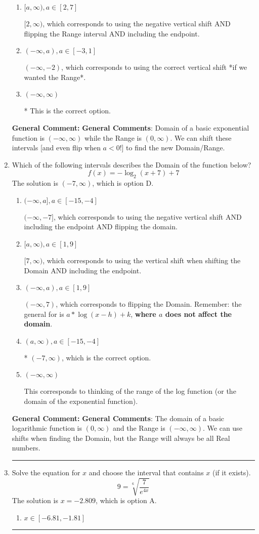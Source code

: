 \documentclass{extbook}[14pt]
\newcommand{\litem}[1]{\item #1

\rule{\textwidth}{0.4pt}}
\begin{document}
\begin{enumerate}
{\begin{enumerate}[label=\Alph*.]
$(2, \infty)$, which corresponds to using the negative vertical shift AND flipping the Range interval.
\item \( [a, \infty), a \in [2, 7] \)

$[2, \infty)$, which corresponds to using the negative vertical shift AND flipping the Range interval AND including the endpoint.
\item \( (-\infty, a), a \in [-3, 1] \)

$(-\infty, -2)$, which corresponds to using the correct vertical shift *if we wanted the Range*.
\item \( (-\infty, \infty) \)

* This is the correct option.
\end{enumerate}

\textbf{General Comment:} \textbf{General Comments}: Domain of a basic exponential function is $(-\infty, \infty)$ while the Range is $(0, \infty)$. We can shift these intervals [and even flip when $a<0$!] to find the new Domain/Range.
}
\litem{
Which of the following intervals describes the Domain of the function below?
\[ f(x) = -\log_2{(x+7)}+7 \]
The solution is \( (-7, \infty) \), which is option D.\begin{enumerate}[label=\Alph*.]
\item \( (-\infty, a], a \in [-15, -4] \)

$(-\infty, -7]$, which corresponds to using the negative vertical shift AND including the endpoint AND flipping the domain.
\item \( [a, \infty), a \in [1, 9] \)

$[7, \infty)$, which corresponds to using the vertical shift when shifting the Domain AND including the endpoint.
\item \( (-\infty, a), a \in [1, 9] \)

$(-\infty, 7)$, which corresponds to flipping the Domain. Remember: the general for is $a*\log(x-h)+k$, \textbf{where $a$ does not affect the domain}.
\item \( (a, \infty), a \in [-15, -4] \)

* $(-7, \infty)$, which is the correct option.
\item \( (-\infty, \infty) \)

This corresponds to thinking of the range of the log function (or the domain of the exponential function).
\end{enumerate}

\textbf{General Comment:} \textbf{General Comments}: The domain of a basic logarithmic function is $(0, \infty)$ and the Range is $(-\infty, \infty)$. We can use shifts when finding the Domain, but the Range will always be all Real numbers.
}
\litem{
 Solve the equation for $x$ and choose the interval that contains $x$ (if it exists).
\[  9 = \sqrt[6]{\frac{7}{e^{4x}}} \]
The solution is \( x = -2.809 \), which is option A.\begin{enumerate}[label=\Alph*.]
\item \( x \in [-6.81, -1.81] \)


\end{enumerate}}
\end{enumerate}
\end{document}

